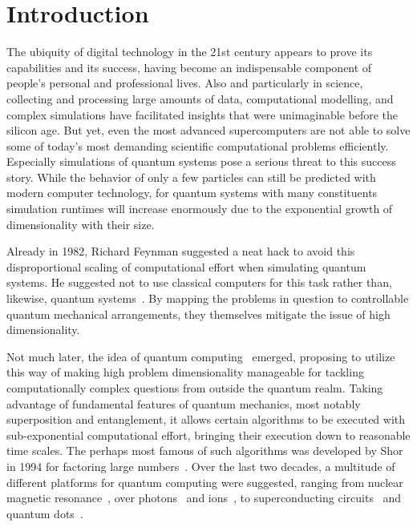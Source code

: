 \renewcommand{\imagepath}{../10-intro/img}

\chapter{Introduction}
The ubiquity of digital technology in the 21st century appears to prove its capabilities and its success, having become an indispensable component of people's personal and professional lives. Also and particularly in science, collecting and processing large amounts of data, computational modelling, and complex simulations have facilitated insights that were unimaginable before the silicon age. But yet, even the most advanced supercomputers are not able to solve some of today's most demanding scientific computational problems efficiently. Especially simulations of quantum systems pose a serious threat to this success story. While the behavior of only a few particles can still be predicted with modern computer technology, for quantum systems with many constituents simulation runtimes will increase enormously due to the exponential growth of dimensionality with their size.

Already in 1982, Richard Feynman suggested a neat hack to avoid this disproportional scaling of computational effort when simulating quantum systems. He suggested not to use classical computers for this task rather than, likewise, quantum systems~\cite{feynman_simulating_1982}. By mapping the problems in question to controllable quantum mechanical arrangements, they themselves mitigate the issue of high dimensionality.

Not much later, the idea of quantum computing~\cite{nielsen_quantum_2010, hidary_quantum_2021, ladd_quantum_2010, mainzer_quantencomputer_2020} emerged, proposing to utilize this way of making high problem dimensionality manageable for tackling computationally complex questions from outside the quantum realm. Taking advantage of fundamental features of quantum mechanics, most notably superposition and entanglement, it allows certain algorithms to be executed with sub-exponential computational effort, bringing their execution down to reasonable time scales. The perhaps most famous of such algorithms was developed by Shor in 1994 for factoring large numbers~\cite{shor_algorithms_1994}. Over the last two decades, a multitude of different platforms for quantum computing were suggested, ranging from nuclear magnetic resonance~\cite{cory_ensemble_1997}, over photons~\cite{duan_scalable_2004,zhong_quantum_2020} and ions~\cite{home_complete_2009}, to superconducting circuits~\cite{dicarlo_demonstration_2009, arute_quantum_2019-1} and quantum dots~\cite{hanson_spins_2007}.

